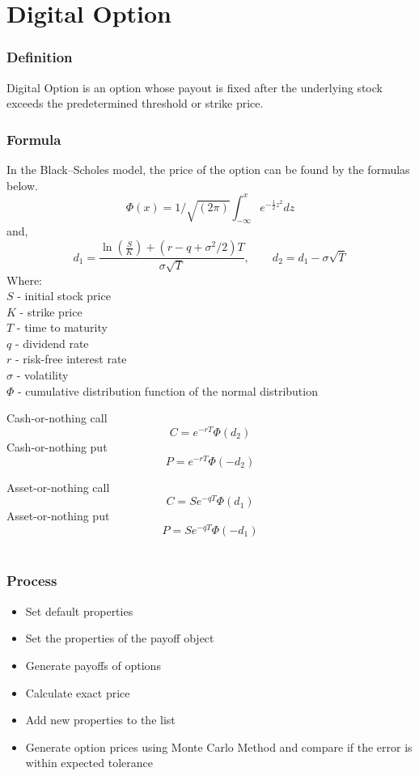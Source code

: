 \documentclass[10pt,Compress]{beamer}
\begin{document}
\section{Digital Option}
\begin{frame}
\frametitle{Definition}
Digital Option is an option whose payout is fixed after the underlying stock exceeds the predetermined threshold or strike price. 
\end{frame}



\begin{frame}
\frametitle{Formula}
In the Black–Scholes model, the price of the option can be found by the formulas below.
$$\Phi(x)=1/\sqrt{(2\pi)}\int_{-\infty}^{x}e^{-\frac{1}{2}z^2}dz$$
and,
$$d_1=\frac{\ln(\frac{S}{K})+(r-q+\sigma^2/2)T}{\sigma\sqrt{T}},\quad\quad d_2=d_1-\sigma\sqrt{T}$$
Where:\\
$S$ - initial stock price\\
$K$ - strike price\\
$T$ - time to maturity\\
$q$ - dividend rate\\
$r$ - risk-free interest rate\\
$\sigma$ - volatility\\
$\Phi$ - cumulative distribution function of the normal distribution
\end{frame}

\begin{frame}
Cash-or-nothing call\\
$$C=e^{-rT}\Phi(d_2)$$
Cash-or-nothing put\\
$$P=e^{-rT}\Phi(-d_2)$$

Asset-or-nothing call\\
$$C=Se^{-qT}\Phi(d_1)$$
Asset-or-nothing put\\
$$P=Se^{-qT}\Phi(-d_1)$$
\\
\end{frame}

\begin{frame}
\frametitle{Process}
\begin{itemize}
\item Set default properties
\item Set the properties of the payoff object
\item Generate payoffs of options
\item Calculate exact price
\item Add new properties to the list 
\item Generate option prices using Monte Carlo Method and compare if the error is within expected tolerance
\end{itemize}
\end{frame}
\end{document}
